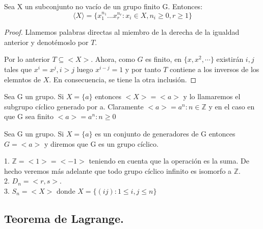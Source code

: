 \begin{proposition}
Sea X un subconjunto no vacío de un grupo finito G. Entonces: $$\langle X \rangle = \{x_1^{n_1}...x_r^{n_r}:x_i \in X,n_i \ge 0,r \ge 1\}$$
\end{proposition}
\begin{proof}
Llamemos palabras directas al miembro de la derecha de la igualdad anterior y denotémoslo por $T$. 

Por lo anterior $T \subseteq <X>$. Ahora, como $G$ es finito, en $\{x,x^2,\cdots\}$ existirán $i,j$ tales que $x^i = x^j, i > j$ luego $x^{i-j} = 1$ y por tanto $T$ contiene a los inversos de los elemntos de $X$. En consecuencia, se tiene la otra inclusión.
\end{proof}

\begin{definition}
Sea G un grupo. Si $X = \{a\}$ entonces $<X> = <a>$ y lo llamaremos el subgrupo cíclico generado por a. Claramente $<a> = {a^n : n \in \mathbb{Z}}$ y en el caso en que G sea finito $<a> = {a^n : n \ge 0}$
\end{definition}

\begin{definition}
Sea G un grupo. Si $X = \{a\}$ es un conjunto de generadores de G entonces $G = <a>$ y diremos que G es un grupo cíclico.
\end{definition}

\begin{example}
1. $\mathbb{Z} = <1> = <-1>$ teniendo en cuenta que la operación es la suma. De hecho veremos más adelante que todo grupo cíclico infinito es isomorfo a $\mathbb{Z}$.\\
2. $D_n = <r,s>$. \\
3. $S_n = <X>$ donde $X = \{(ij):1 \le i,j \le n\}$
\end{example}

\subsection{Teorema de Lagrange.}

